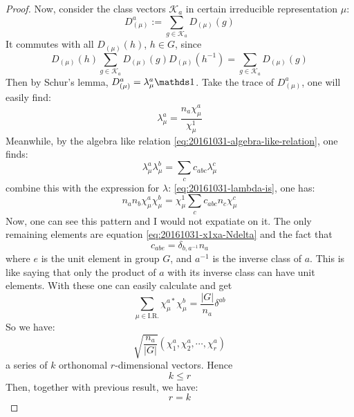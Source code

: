 \begin{proof}
        Now, consider the class vectors $\mathcal{K}_a$ in certain
        irreducible representation $\mu$:
        \begin{equation}
            D^a_{(\mu)} := \sum_{g\in \mathcal{K}_a} D_{(\mu)}(g)
        \end{equation}
        It commutes with all $D_{(\mu)}(h)$, $h\in G$, since
        $$D_{(\mu)}(h) \sum_{g\in \mathcal{K}_a} D_{(\mu)}(g)
        D_{(\mu)}(h^{-1})= \sum_{g\in \mathcal{K}_a} D_{(\mu)}(g)$$
        Then by Schur's lemma, $D^a_{(\mu)}= \lambda^a_\mu
        \id$.
        Take the trace of $D^a_{(\mu)}$, one will easily find:
        \begin{equation}
            \label{eq:20161031-lambda-is}
            \lambda^a_\mu = \frac{n_a\chi^a_{\mu}}{\chi^1_\mu}
        \end{equation}
        Meanwhile, by the algebra like relation
        \ref{eq:20161031-algebra-like-relation}, one finds:
        \begin{equation}
            \lambda^a_\mu \lambda^b_\mu = \sum_c c_{abc} \lambda^c_\mu
        \end{equation}
        combine this with the expression for $\lambda$:
        \ref{eq:20161031-lambda-is}, one has:
        \begin{equation}
            n_a n_b \chi^a_\mu \chi^b_\mu = \chi^1_\mu\sum_c
            c_{abc}n_c\chi^c_\mu
        \end{equation}
        Now, one can see this pattern and I would not expatiate on
        it. The only remaining elements are equation
        \ref{eq:20161031-x1xa-Ndelta} and the fact that
        \begin{equation}
            c_{abe} = \delta_{b,a^{-1}} n_a
        \end{equation}
        where $e$ is the unit element in group $G$, and $a^{-1}$ is
        the inverse class of $a$. This is like saying that only the
        product of $a$ with its inverse class can have unit elements.
        With these one can easily calculate and get
        \begin{equation}
            \sum_{\mu \in \text{I.R.}} \chi^{a*}_\mu\chi^b_\mu = 
            \frac{|G|}{n_a} \delta^{ab}
            \label{eq:20161031-ortho-character}
        \end{equation}
        So we have:
        \begin{equation}
            \sqrt{\frac{n_a}{|G|}}(\chi^a_1,\chi^a_2,\cdots,\chi^a_r)
        \end{equation}
        a series of $k$ orthonomal $r$-dimensional vectors. Hence
        \begin{equation}
            k\leq r
        \end{equation}
        Then, together with previous result, we have:
        \begin{equation}
            r = k
        \end{equation}
    \end{proof}

